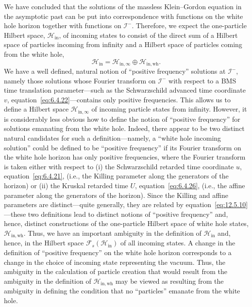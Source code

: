 We have concluded that the solutions of the massless Klein--Gordon equation in the
asymptotic past can be put into correspondence with functions on the white hole
horizon together with functions on \(\mathcal I^-\). Therefore, we expect the
one-particle Hilbert space, \(\mathcal H_{\mathrm{in}}\), of incoming states to consist
of the direct sum of a Hilbert space of particles incoming from infinity and a Hilbert
space of particles coming from the white hole,
\[
  \mathcal H_{\mathrm{in}}
  =\mathcal H_{\mathrm{in},\infty}\oplus\mathcal H_{\mathrm{in},\mathrm{wh}}.
\]
We have a well defined, natural notion of ``positive frequency'' solutions at
\(\mathcal I^-\), namely those solutions whose Fourier transform on \(\mathcal I^-\)
with respect to a BMS time translation parameter---such as the Schwarzschild
advanced time coordinate \(v\), equation~\eqref{eq:6.4.22}---contains only positive
frequencies. This allows us to define a Hilbert space
\(\mathcal H_{\mathrm{in},\infty}\) of incoming particle states from infinity.
However, it is considerably less obvious how to define the notion of ``positive
frequency'' for solutions emanating from the white hole. Indeed, there appear to be
two distinct natural candidates for such a definition---namely, a ``white hole
incoming solution'' could be defined to be ``positive frequency'' if its Fourier
transform on the white hole horizon has only positive frequencies, where the Fourier
transform is taken either with respect to (i) the Schwarzschild retarded time
coordinate \(u\), equation~\eqref{eq:6.4.21}, (i.e., the Killing parameter along the
generators of the horizon) or (ii) the Kruskal retarded time \(U\),
equation~\eqref{eq:6.4.26}, (i.e., the affine parameter along the generators of the
horizon). Since the Killing and affine parameters are distinct---quite generally,
they are related by equation~\eqref{eq:12.5.10}---these two definitions lead to
distinct notions of ``positive frequency'' and, hence, distinct constructions of the
one-particle Hilbert space of white hole states,
\(\mathcal H_{\mathrm{in},\mathrm{wh}}\). Thus, we have an important ambiguity in
the definition of \(\mathcal H_{\mathrm{in}}\) and, hence, in the Hilbert space
\(\mathcal F_s(\mathcal H_{\mathrm{in}})\) of all incoming states. A change in the
definition of ``positive frequency'' on the white hole horizon corresponds to a change
in the choice of incoming state representing the vacuum. Thus, the ambiguity in the
calculation of particle creation that would result from the ambiguity in the definition
of \(\mathcal H_{\mathrm{in},\mathrm{wh}}\) may be viewed as resulting from the
ambiguity in defining the condition that no ``particles'' emanate from the white hole.

